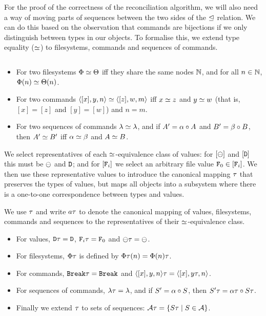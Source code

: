 \bigskip


\noindent
For the proof of the correctness of the reconciliation algorithm,
we will also need a way of moving parts of sequences between the two
sides of the $\trianglelefteq$ relation.
We can do this based on the observation that commands are bijections
if we only distinguish between types in our objects.
To formalise this, we extend type equality ($\simeq$)
to filesystems, commands and sequences of commands.
\begin{mydef}
$ $ %
\begin{itemize}
\item For two filesystems $\Phi\simeq\Theta$ iff they share the same nodes $\mathbb{N}$,
and for all $n\in\mathbb{N}$, $\Phi(n) \simeq \Theta(n)$.
\item For two commands $\langle{[x],y,n}\rangle\simeq\langle{[z],w,m}\rangle$ iff 
$x\simeq z$ and $y\simeq w$
(that is, $[x]=[z]$ and $[y]=[w]$)
and $n=m$.
\item For two sequences of commands $\lambda\simeq\lambda$, and
if $A'=\alpha\circ A$ and $B'=\beta\circ B$, then $A'\simeq B'$ iff $\alpha\simeq\beta$ and $A\simeq B$.
\end{itemize}
\end{mydef}

We select representatives of each $\simeq$-equivalence class of values:
for $[\ominus]$ and $[\mathtt{D}]$ this must be $\ominus$ and $\mathtt{D}$; and
for $[\mathtt{F}_i]$ we select an arbitrary file value $\mathtt{F}_0\in[\mathtt{F}_i]$.
We then use these representative values to
introduce the canonical mapping $\T$ that preserves the types of values,
but maps all objects into a subsystem where there is a one-to-one
correspondence between types and values.

\begin{mydef}[$\T$]
We use $\T$ and write $a\tau$ to denote the canonical mapping of 
values, filesystems, commands and sequences to the
representatives of their $\simeq$-equivalence class.
\begin{itemize}
\item For values, $\mathtt{D}\tau=\mathtt{D}$, $\mathtt{F}_i\tau=\mathtt{F}_0$ and $\ominus\tau=\ominus$.
\item For filesystems, $\Phi\tau$ is defined by $\Phi\tau(n) = \Phi(n)\tau$.
\item For commands, $\mathtt{Break}\tau=\mathtt{Break}$ and $\langle{[x],y,n}\rangle\tau = \langle{[x],{y}\tau,n}\rangle$.
\item For sequences of commands, $\lambda\tau=\lambda$, and if $S'=\alpha\circ S$, then $S'\tau=\alpha\tau\circ S\tau$.
\item Finally we extend $\T$ to sets of sequences: $\mathcal{A}\tau = \{S\tau \mathrel{|} S\in\mathcal{A}\}$.
\end{itemize}
\end{mydef}

